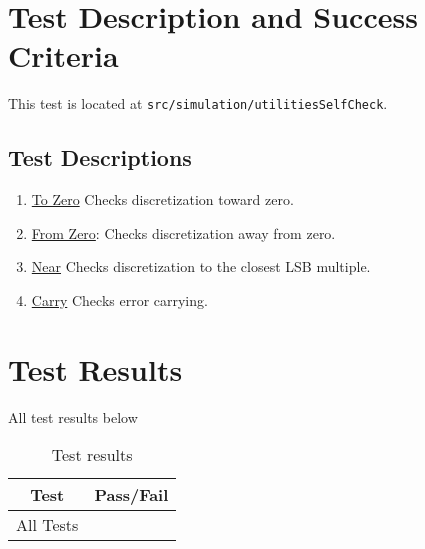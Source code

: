\section{Test Description and Success Criteria}
This test is located at {\tt src/simulation/utilitiesSelfCheck}. \par

\subsection{Test Descriptions}


\begin{enumerate}
	\item \underline{To Zero} Checks discretization toward zero.
	\item \underline{From Zero}: Checks discretization away from zero.
	\item \underline{Near} Checks discretization to the closest LSB multiple.
	\item \underline{Carry} Checks error carrying.
	
\end{enumerate} 

\section{Test Results}
All test results below

\begin{table}[H]
	\caption{Test results}
	\label{tab:results}
	\centering \fontsize{10}{10}\selectfont
	\begin{tabular}{ c | c  } %
		\hline
		\textbf{Test} 						  		&\textbf{Pass/Fail} \\ \hline
		All Tests	   			&  \\ \hline
	\end{tabular}

\end{table}



\pagebreak %